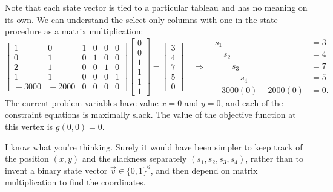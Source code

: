 \documentclass[11pt,oneside]{article}
\begin{document}
		Note that each state vector is tied to a particular tableau and has no meaning on its own.
		We can understand the select-only-columns-with-one-in-the-state procedure as a matrix multiplication:
		{\footnotesize
		\[
			\left[
			\begin{array}{rrrrrr}
				    1&     0& 1& 0& 0& 0      \\ 
				    0&     1& 0& 1& 0& 0       \\ 
				    2&     1& 0& 0& 1& 0       \\ 
				    1&     1& 0& 0& 0& 1        \\ 
				\!\!\!-3000& \!\!\!\!-2000& 0& 0& 0& 0  
			\end{array}
			\right]	
			\!\!
			\begin{bmatrix}
				0 \\ 0 \\  1 \\ 1 \\ 1 \\ 1 
			\end{bmatrix}\!
			=
			\!
			\begin{bmatrix}
				3 \\ 4 \\  7 \\ 5 \\ 0 
			\end{bmatrix}			
			\quad	
			\Rightarrow
			\ \ \
			\begin{array}{rl}
					s_1 \quad \quad \quad		\ &=	 3	\\
					\quad s_2 \quad \quad 		\ &= 	 4	\\
					\quad \quad  s_3 \quad 		\ &= 	 7	\\
					 \quad \quad \quad  s_4   		\ &= 	 5	\\
			        - 3000(0)  -   2000(0)     \!\!&=  0.
			\end{array} 				
		\]}%
		The current problem variables have value $x=0$ and $y=0$,
		and each of the constraint equations is maximally slack.
		The value of the objective function at this vertex is $g(0,0)=0$.
		
		I know what you're thinking.
		Surely it would have been simpler to keep track of the position $(x,y)$ 
		and the slackness separately $(s_1,s_2,s_3,s_4)$,
		rather than to invent a binary state vector $\vec{v} \in \{0, 1\}^{6}$,
		and then depend on matrix multiplication to find the coordinates.
		
\end{document}
